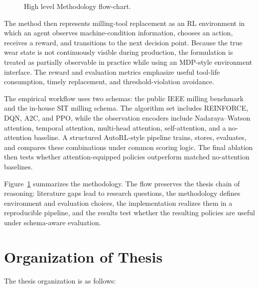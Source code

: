 \documentclass[12pt,oneside]{book}
\begin{document}
\begin{figure}[h]
	\caption{High level Methodology flow-chart.}
	\label{fig:intro-method-flow}
\end{figure}

The method then represents milling-tool replacement as an RL environment in which an agent observes machine-condition information, chooses an action, receives a reward, and transitions to the next decision point. Because the true wear state is not continuously visible during production, the formulation is treated as partially observable in practice while using an MDP-style environment interface. The reward and evaluation metrics emphasize useful tool-life consumption, timely replacement, and threshold-violation avoidance.

The empirical workflow uses two schemas: the public IEEE milling benchmark and the in-house SIT milling schema. The algorithm set includes \textsc{REINFORCE}, DQN, A2C, and PPO, while the observation encoders include Nadaraya--Watson attention, temporal attention, multi-head attention, self-attention, and a no-attention baseline. A structured AutoRL-style pipeline trains, stores, evaluates, and compares these combinations under common scoring logic. The final ablation then tests whether attention-equipped policies outperform matched no-attention baselines.

Figure~\ref{fig:intro-method-flow} summarizes the methodology. The flow preserves the thesis chain of reasoning: literature gaps lead to research questions, the methodology defines environment and evaluation choices, the implementation realizes them in a reproducible pipeline, and the results test whether the resulting policies are useful under schema-aware evaluation.

\section{Organization of Thesis}

The thesis organization is as follows:
\end{document}
